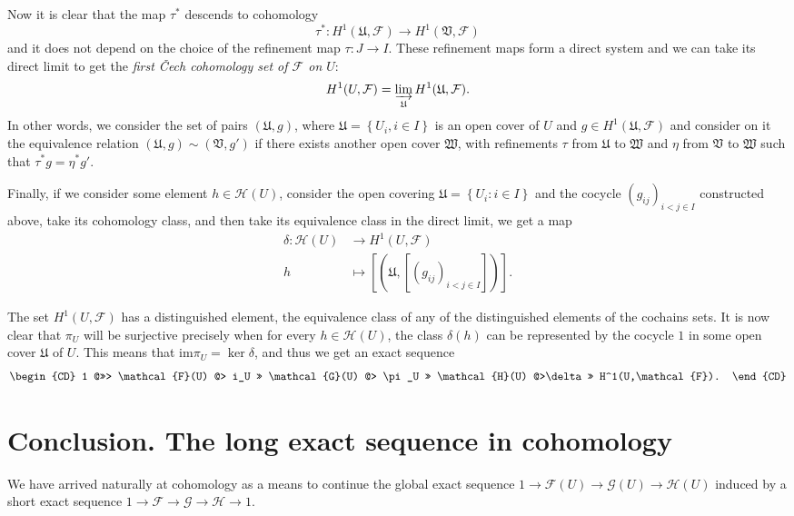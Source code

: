 	Now it is clear that the map $\tau^*$ descends to cohomology
	\begin{equation*}
	  \tau^*: H^1(\mathfrak{U},\mathcal{F})\rightarrow H^1(\mathfrak{V},\mathcal{F})
	\end{equation*}
	and it does not depend on the choice of the refinement map $\tau:J \rightarrow I$. These refinement maps form a direct system and we can take its direct limit to get the \emph{first \v{C}ech cohomology set of $\mathcal{F}$ on $U$}:
	\begin{equation*}
	  H^1(U,\mathcal{F})=\varinjlim_{\mathfrak{U}} H^1(\mathfrak{U},\mathcal{F}).
	\end{equation*}
	In other words, we consider the set of pairs $(\mathfrak{U},g)$, where $\mathfrak{U}=\left\{ U_i,i\in I \right\}$ is an open cover of $U$ and $g\in H^1(\mathfrak{U},\mathcal{F})$ and consider on it the equivalence relation $(\mathfrak{U},g)\sim (\mathfrak{V},g')$ if there exists another open cover $\mathfrak{W}$, with refinements $\tau$ from $\mathfrak{U}$ to $\mathfrak{W}$ and $\eta$ from $\mathfrak{V}$ to $\mathfrak{W}$ such that $\tau^*g=\eta^*g'$.

	Finally, if we consider some element $h\in \mathcal{H}(U)$, consider the open covering $\mathfrak{U}=\left\{ U_i:i\in I \right\}$ and the cocycle $(g_{ij})_{i<j\in I}$ constructed above, take its cohomology class, and then take its equivalence class in the direct limit, we get a map
	\begin{align*}
	  \delta:\mathcal{H}(U)&\longrightarrow H^1(U,\mathcal{F})\\ 
	  h &\longmapsto [(\mathfrak{U},[(g_{ij})_{i<j\in I}])]. 
	  \end{align*}

	  The set $H^1(U,\mathcal{F})$ has a distinguished element, the equivalence class of any of the distinguished elements of the cochains sets. It is now clear that $\pi_U$ will be surjective precisely when for every $h\in \mathcal{H}(U)$, the class $\delta(h)$ can be represented by the cocycle $1$ in some open cover $\mathfrak{U}$ of $U$. This means that $\mathrm{im} \pi_U=\ker \delta$, and thus we get an exact sequence
	  \begin{equation*}
      \begin{CD}
	1 @>>>	\mathcal{F}(U) @> i_U >> \mathcal{G}(U) @> \pi_U >> \mathcal{H}(U) @>\delta >> H^1(U,\mathcal{F}).
      \end{CD}
	  \end{equation*}

	  \section*{Conclusion. The long exact sequence in cohomology}
	  We have arrived naturally at cohomology as a means to continue the global exact sequence $1\rightarrow \mathcal{F}(U) \rightarrow \mathcal{G}(U) \rightarrow \mathcal{H}(U)$ induced by a short exact sequence $1\rightarrow \mathcal{F} \rightarrow \mathcal{G} \rightarrow \mathcal{H}\rightarrow 1$.

